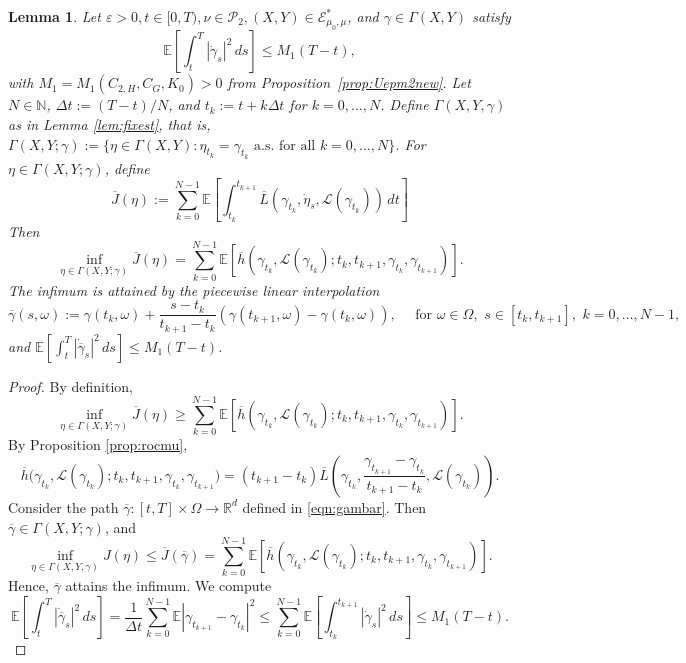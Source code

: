 \documentclass[reqno,11pt]{amsart}
\newtheorem{lemma}[theorem]{Lemma}
\numberwithin{equation}{section}
\newcommand{\R}{\mathbb{R}} %
\newcommand{\e}{\varepsilon}
\renewcommand{\bar}{\overline}
\begin{document}
\begin{lemma}\label{lem:lbarpart}
Let $\e>0, t\in[0,T), \nu\in\mathcal P_2, (X,Y)\in\mathcal{E}_{\mu_0,\mu}^\ast$, and $\gamma\in\Gamma(X,Y) $ satisfy
\[\mathbb{E}\left[\int_t^T\left|\dot{\gamma}_s\right|^2\,
ds\right] \leq M_1(T-t),
\]
with $M_1=M_1(C_{2, H}, C_G, K_0)>0$ from Proposition~\ref{prop:Uepm2new}. Let $N \in \mathbb{N}$, $\Delta t := (T-t)/N$, and $t_k := t + k\Delta t$ for $k=0,\dots,N$. Define $\Gamma(X,Y,\gamma)$ as in Lemma \ref{lem:fixest}, that is, $\Gamma(X,Y;\gamma)
:=
\{\eta\in \Gamma(X,Y) : \eta_{t_k}=\gamma_{t_k}\,\, \text{a.s. for all } k=0,\dots,N\}$. For $\eta \in \Gamma(X,Y; \gamma)$, define
\[
\bar{J}(\eta)
:=
\sum_{k=0}^{N-1}
\mathbb E \left[
\int_{t_k}^{t_{k+1}}
\bar L \left(\gamma_{t_k},\dot{\eta}_s,\mathcal{L}\left(\gamma_{t_k}\right)\right)\,dt\right]
\]
Then
\[
\inf_{\eta \in\Gamma(X,Y;\gamma)} \bar J(\eta)
=
\sum_{k=0}^{N-1}
\mathbb{E} \left[
\bar{h} \left(\gamma_{t_k},\mathcal{L}\left(\gamma_{t_k}\right);t_k,t_{k+1},
\gamma_{t_k},\gamma_{t_{k+1}}\right)\right].
\]
The infimum is attained by the piecewise linear interpolation
\begin{equation}\label{eqn:gambar}
\bar{\gamma}(s,\omega):=\gamma(t_k,\omega)+\frac{s-t_k}{t_{k+1}-t_k}\left(\gamma(t_{k+1}, \omega)-\gamma(t_k,\omega)\right), \quad \text{ for } \omega \in \Omega, \,\,s \in \left[t_k, t_{k+1}\right], \, \,k=0,\dots,N-1,
\end{equation}
and $\displaystyle \mathbb{E}\left[\int_t^T \left|\dot{\bar{\gamma}}_s\right|^2 \,ds\right] \leq M_1(T-t)$.
\end{lemma}




\begin{proof}
By definition,
\[
\inf_{\eta \in \Gamma(X,Y;\gamma)}
\bar{J}(\eta)
\geq
\sum_{k=0}^{N-1}
\mathbb{E} \left[
\bar{h}
\left(\gamma_{t_k},\mathcal{L}(\gamma_{t_k});t_k,t_{k+1},
\gamma_{t_k},\gamma_{t_{k+1}}\right)\right].
\]
By Proposition \ref{prop:rocmu},
\[
\bar{h}
\bigl(\gamma_{t_k},\mathcal{L}(\gamma_{t_k});t_k,t_{k+1},
\gamma_{t_k},\gamma_{t_{k+1}}\bigr)=\left(t_{k+1}-t_k\right) \bar{L}\left(\gamma_{t_k}, \frac{\gamma_{t_{k+1}}-\gamma_{t_k}}{t_{k+1}-t_{k}}, \mathcal{L}(\gamma_{t_k})\right).
\]
Consider the path $\bar{\gamma}:[t,T] \times \Omega \to \R^d$ defined in \eqref{eqn:gambar}. Then $\bar{\gamma}\in \Gamma(X,Y;\gamma)$, and
\[
\inf_{\eta \in \Gamma(X,Y,\gamma)}
J(\eta) \leq \bar{J}(\bar{\gamma})=\sum_{k=0}^{N-1}
\mathbb{E} \left[\bar{h}\left(\gamma_{t_k},\mathcal{L}(\gamma_{t_k}); t_k, t_{k+1}, \gamma_{t_k}, \gamma_{t_{k+1}}\right) \right].
\]
Hence, $\bar{\gamma}$ attains the infimum.
We compute
\[
\mathbb{E} \left[\int_t^{T} \left|\dot{\bar{\gamma}}_s\right|^2\,ds\right] = \frac{1}{\Delta t}\sum_{k=0}^{N-1}\mathbb{E}\left|\gamma_{t_{k+1}}-\gamma_{t_k}\right|^2 \leq \sum_{k=0}^{N-1}\mathbb{E} \left[\int_{t_k}^{t_{k+1}} \left|\dot{\gamma}_s\right|^2\,ds\right] \leq M_1(T-t).
\]
\end{proof}
\end{document}
